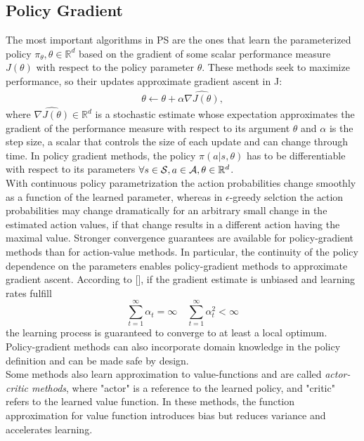 \subsection{Policy Gradient}
The most important algorithms in \ac{PS} are the ones that learn the parameterized policy $\pi_{\theta}, \theta \in \mathbb{R}^d$ based on the gradient of some scalar performance measure $J(\theta)$ with respect to the policy parameter $\theta$. These methods seek to maximize performance, so their updates approximate gradient ascent in J:
\begin{align}
\theta \leftarrow \theta + \alpha \widehat{\nabla J(\theta)}, \label{eq:grad}
\end{align}
where $\widehat{\nabla J(\theta)} \in \mathbb{R}^d$ is a stochastic estimate whose expectation approximates the gradient of the performance measure with respect to its argument $\theta$ and $\alpha$ is the step size, a scalar that controls the size of each update and can change through time. In policy gradient methods, the policy $\pi(a|s,\theta)$ has to be differentiable with respect to its parameters $\forall s \in \mathcal{S}, a \in \mathcal{A}, \theta \in \mathbb{R}^d$.\\
\newline
With continuous policy parametrization the action probabilities change smoothly as a function of the learned parameter, whereas in $\epsilon$-greedy selction the action probabilities may change dramatically for an arbitrary small change in the estimated action values, if that change results in a different action having the maximal value. Stronger convergence guarantees are available for policy-gradient methods than for action-value methods. In particular, the continuity of the policy dependence on the parameters enables policy-gradient methods to approximate gradient ascent. According to [\cite{Peters2008ReinforcementLO}], if the gradient estimate is unbiased and learning rates fulfill
$$\sum_{t=1}^{\infty}\alpha_t = \infty \quad \sum_{t=1}^{\infty}\alpha_t^2 < \infty$$ 
the learning process is guaranteed to converge to at least a local optimum. Policy-gradient methods can also incorporate domain knowledge in the policy definition and can be made safe by design.\\
\newline
Some methods also learn approximation to value-functions and are called \emph{actor-critic methods}, where "actor" is a reference to the learned policy, and "critic" refers to the learned value function. In these methods, the function approximation for value function introduces bias but reduces variance and accelerates learning.

